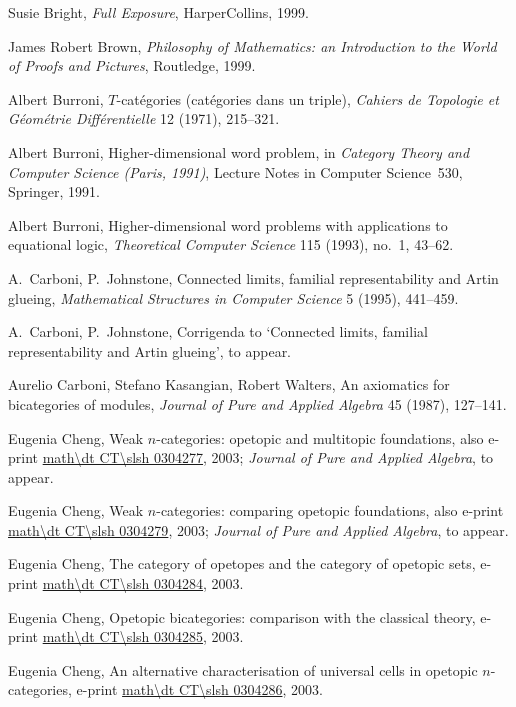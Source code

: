 \begin{thebibliography}{c9999}
Susie Bright,
\emph{Full Exposure},
HarperCollins, 1999.

James Robert Brown,
\emph{Philosophy of Mathematics: an Introduction to the World of Proofs and
Pictures},
Routledge, 1999. 

Albert Burroni,  
$T$-cat\'egories (cat\'egories dans un triple),
\emph{Cahiers de Topologie et G\'eom\'etrie Diff\'erentielle} 
12 (1971), 215--321.

Albert Burroni,
Higher-dimensional word problem,
in \emph{Category Theory and Computer Science (Paris, 1991)},
Lecture Notes in Computer Science~530,
Springer, 1991.
 
Albert Burroni,
Higher-dimensional word problems with applications to equational logic,
\emph{Theoretical Computer Science} 115 (1993), no.~1, 43--62.

A.~Carboni, P.~Johnstone,
Connected limits, familial representability and Artin glueing,
\emph{Mathematical Structures in Computer Science} 5 (1995), 441--459.

A.~Carboni, P.~Johnstone, 
Corrigenda to `Connected limits, familial
representability and Artin glueing', to appear.

Aurelio Carboni, Stefano Kasangian, Robert Walters,
An axiomatics for bicategories of modules,
\emph{Journal of Pure and Applied Algebra} 45 (1987), 127--141.

Eugenia Cheng,
Weak $n$-categories: opetopic and multitopic foundations,
also e-print \url{math\dt CT\slsh 0304277}, 2003;
\emph{Journal of Pure and Applied Algebra}, to appear.

Eugenia Cheng,
Weak $n$-categories: comparing opetopic foundations,
also e-print \url{math\dt CT\slsh 0304279}, 2003;
\emph{Journal of Pure and Applied Algebra}, to appear.

Eugenia Cheng,
The category of opetopes and the category of opetopic sets,
e-print \url{math\dt CT\slsh 0304284}, 2003.

Eugenia Cheng,
Opetopic bicategories: comparison with the classical theory,
e-print \url{math\dt CT\slsh 0304285}, 2003.

Eugenia Cheng,
An alternative characterisation of universal cells in opetopic
$n$-categories,
e-print \url{math\dt CT\slsh 0304286}, 2003.


\end{thebibliography}
